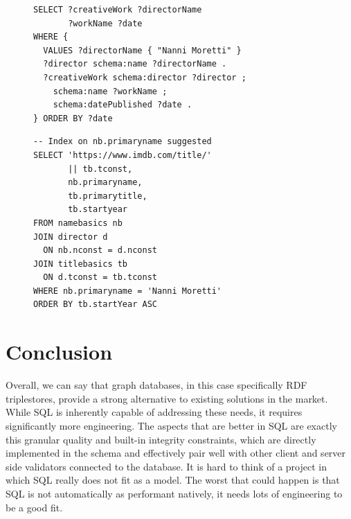 \documentclass[a4paper,10pt]{article}
\begin{document}
\begin{figure}[h]
\begin{minipage}[t]{0.48\textwidth}
    \lstset{style=sparqlstyle}
    \begin{lstlisting}[caption={SPARQL Query}]
SELECT ?creativeWork ?directorName
       ?workName ?date
WHERE {
  VALUES ?directorName { "Nanni Moretti" }
  ?director schema:name ?directorName .
  ?creativeWork schema:director ?director ;
    schema:name ?workName ;
    schema:datePublished ?date .
} ORDER BY ?date
    \end{lstlisting}
\end{minipage}
\hfill
\begin{minipage}[t]{0.48\textwidth}
    \lstset{style=sqlstyle}
    \begin{lstlisting}[caption={SQL Query}]
-- Index on nb.primaryname suggested
SELECT 'https://www.imdb.com/title/'
       || tb.tconst,
       nb.primaryname,
       tb.primarytitle,
       tb.startyear
FROM namebasics nb
JOIN director d
  ON nb.nconst = d.nconst
JOIN titlebasics tb
  ON d.tconst = tb.tconst
WHERE nb.primaryname = 'Nanni Moretti'
ORDER BY tb.startYear ASC
    \end{lstlisting}
\end{minipage}
\end{figure}


\section{Conclusion}

Overall, we can say that graph databases, in this case specifically
RDF triplestores, provide a strong alternative to existing solutions
in the market. While SQL is inherently capable of addressing these
needs, it requires significantly more engineering. The aspects that
are better in SQL are exactly this granular quality and built-in
integrity constraints, which are directly implemented in the schema
and effectively pair well with other client and server side validators
connected to the database. It is hard to think of a project in which
SQL really does not fit as a model. The worst that could happen is
that SQL is not automatically as performant natively, it needs lots of
engineering to be a good fit.
\end{document}
